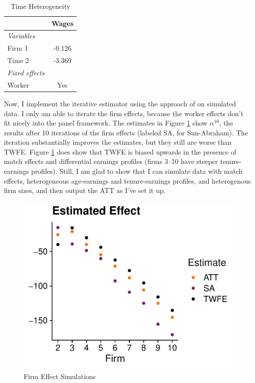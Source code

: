 \documentclass{article}
\begin{document}
\begin{table}[H]
    \centering
    \caption{Time Heterogeneity}
   \begin{tabular}{lc}
   \tabularnewline\midrule\midrule
   & Wages\\
   \midrule \emph{Variables} &  \\
   Firm 1       & -0.126\\
   Time 2        & -3.369\\
   \midrule \emph{Fixed effects} &  \\
   Worker              & Yes\\
   \midrule
\end{tabular}
    \label{tab:TimeHet}
\end{table}

Now, I implement the iterative estimator using the approach of \citet{sun2021estimating} on simulated data. I only am able to iterate the firm effects, because the worker effects don't fit nicely into the panel framework. The estimates in Figure \ref{fig:firmEffects} show $\alpha^10$, the results after 10 iterations of the firm effects (labeled SA, for Sun-Abraham). The iteration substantially improves the estimates, but they still are worse than TWFE. Figure \ref{fig:firmEffects} does show that TWFE is biased upwards in the presence of match effects and differential earnings profiles (firms 3--10 have steeper tenure-earnings profiles). Still, I am glad to show that I can simulate data with match effects, heterogeneous age-earnings and tenure-earnings profiles, and heterogenous firm sizes, and then output the ATT as I've set it up.

\begin{figure}[H]
    \centering
    \includegraphics{FirmEffects.pdf}
    \caption{Firm Effect Simulations}
    \label{fig:firmEffects}
\end{figure}
\end{document}
